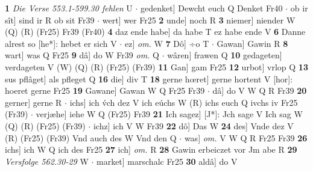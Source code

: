 \documentclass[8pt,a4paper,notitlepage]{article}
\begin{document}
\begin{table}[ht]
\begin{minipage}[t]{0.5\linewidth}
\textbf{1} \textit{Die Verse 553.1-599.30 fehlen} U   $\cdot$ gedenket] Dewcht euch Q Denket Fr40  $\cdot$ ob ir sît] sind ir R ob sit Fr39  $\cdot$ wert] wer Fr25 \textbf{2} unde] noch R \textbf{3} niemer] niender W (Q) (R) (Fr25) Fr39 (Fr40) \textbf{4} daz ende habe] da habe T ez habe ende V \textbf{6} Danne alrest so [he*]: hebet er sich V  $\cdot$ ez] \textit{om.} W \textbf{7} Dô] ÷o T  $\cdot$ Gawan] Gawin R \textbf{8} wart] was Q Fr25 \textbf{9} dâ] do W Fr39 \textit{om.} Q  $\cdot$ wâren] frawen Q \textbf{10} gedageten] verdageten V (W) (Q) (R) (Fr25) (Fr39) \textbf{11} Gan] gam Fr25 \textbf{12} urbot] vrlop Q \textbf{13} sus pflâget] als pfleget Q \textbf{16} die] div T \textbf{18} gerne hœret] gerne hortent V [hor]: hoeret gerne Fr25 \textbf{19} Gawane] Gawan W Q Fr25 Fr39  $\cdot$ dâ] do V W Q R Fr39 \textbf{20} gerner] gerne R  $\cdot$ ichs] ich v́ch dez V ich eúchs W (R) ichs euch Q ivchs iv Fr25 (Fr39)  $\cdot$ verjæhe] iehe W Q (Fr25) Fr39 \textbf{21} Ich sagez] [J*]: Jch sage V Ich sag W (Q) (R) (Fr25) (Fr39)  $\cdot$ ichz] ich V W Fr39 \textbf{22} dô] Das W \textbf{24} des] Vnde dez V (R) (Fr25) (Fr39) Vnd auch des W Vnd den Q  $\cdot$ was] \textit{om.} V W Q R Fr25 Fr39 \textbf{26} ichs] ich W Q ich des Fr25 \textbf{27} ich] \textit{om.} R \textbf{28} Gawin erbeiczet vor Jm abe R \textbf{29} \textit{Versfolge 562.30-29} W   $\cdot$ market] marschalc Fr25 \textbf{30} aldâ] do V \newline
\end{minipage}
\end{table}
\end{document}
